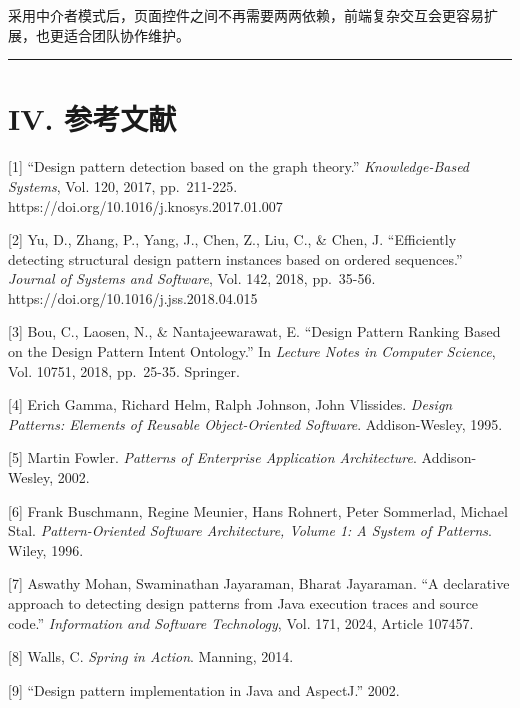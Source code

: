采用中介者模式后，页面控件之间不再需要两两依赖，前端复杂交互会更容易扩展，也更适合团队协作维护。

\begin{center}\rule{0.5\linewidth}{0.5pt}\end{center}

\section{IV. 参考文献}\label{iv.-ux53c2ux8003ux6587ux732e}

{[}1{]} ``Design pattern detection based on the graph theory.''
\emph{Knowledge-Based Systems}, Vol. 120, 2017, pp.~211-225.
https://doi.org/10.1016/j.knosys.2017.01.007

{[}2{]} Yu, D., Zhang, P., Yang, J., Chen, Z., Liu, C., \& Chen, J.
``Efficiently detecting structural design pattern instances based on
ordered sequences.'' \emph{Journal of Systems and Software}, Vol. 142,
2018, pp.~35-56. https://doi.org/10.1016/j.jss.2018.04.015

{[}3{]} Bou, C., Laosen, N., \& Nantajeewarawat, E. ``Design Pattern
Ranking Based on the Design Pattern Intent Ontology.'' In \emph{Lecture
Notes in Computer Science}, Vol. 10751, 2018, pp.~25-35. Springer.

{[}4{]} Erich Gamma, Richard Helm, Ralph Johnson, John Vlissides.
\emph{Design Patterns: Elements of Reusable Object-Oriented Software}.
Addison-Wesley, 1995.

{[}5{]} Martin Fowler. \emph{Patterns of Enterprise Application
Architecture}. Addison-Wesley, 2002.

{[}6{]} Frank Buschmann, Regine Meunier, Hans Rohnert, Peter Sommerlad,
Michael Stal. \emph{Pattern-Oriented Software Architecture, Volume 1: A
System of Patterns}. Wiley, 1996.

{[}7{]} Aswathy Mohan, Swaminathan Jayaraman, Bharat Jayaraman. ``A
declarative approach to detecting design patterns from Java execution
traces and source code.'' \emph{Information and Software Technology},
Vol. 171, 2024, Article 107457.

{[}8{]} Walls, C. \emph{Spring in Action}. Manning, 2014.

{[}9{]} ``Design pattern implementation in Java and AspectJ.'' 2002.
